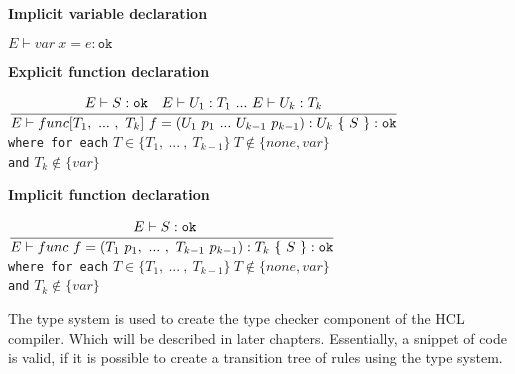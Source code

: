 \textbf{Implicit variable declaration}\\
\begin{center}
	\begin{math}
	E \vdash var\ x = e : \texttt{ok}
	\end{math}
\end{center}

\textbf{Explicit function declaration}\\
\begin{center}
	\begin{math}
		\cfrac
		{E\vdash S : \texttt{ok}\quad E \vdash U_1 : T_1\
			.
			.
			.
			\ E \vdash U_k : T_k}
		{E \vdash func[T_1,\
			.
			.
			.
			\ ,\ T_k]\ f = (U_1\ p_1\
			.
			.
			.
			\ U_{k-1}\ p_{k-1}): U_k\ \{\ S\ \} : \texttt{ok}}
	\end{math}
	\\[1\baselineskip]
	\texttt{where for each} $T \in \{T_1,\ .
	.
	.
	\ ,\ T_{k-1}\}\ T \notin \{none, var\}$\\
	\texttt{and} $T_k \notin \{var\}$
\end{center}

\textbf{Implicit function declaration}\\
\begin{center}
	\begin{math}
		\cfrac
		{E\vdash S : \texttt{ok}\quad}
		{E \vdash func\ f = (T_1\ p_1,\
		.
		.
		.
		\ ,\ T_{k-1}\ p_{k-1}): T_k\ \{\ S\ \} : \texttt{ok}}
	\end{math}
	\\[1\baselineskip]
	\texttt{where for each} $T \in \{T_1,\ .
	.
	.
	\ ,\ T_{k-1}\}\ T \notin \{none, var\}$\\
	\texttt{and} $T_k \notin \{var\}$
\end{center}


The type system is used to create the type checker component of the HCL compiler. Which will be described in later chapters.
Essentially, a snippet of code is valid, if it is possible to create a transition tree of rules using the type system. 

